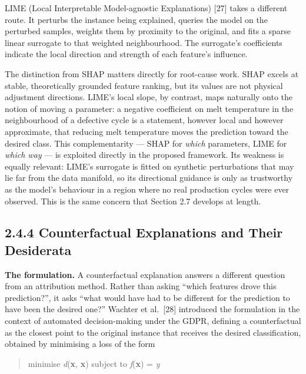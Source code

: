 LIME (Local Interpretable Model-agnostic Explanations) {[}27{]} takes a different route. It perturbs the instance being explained, queries the model on the perturbed samples, weights them by proximity to the original, and fits a sparse linear surrogate to that weighted neighbourhood. The surrogate's coefficients indicate the local direction and strength of each feature's influence.

The distinction from SHAP matters directly for root-cause work. SHAP excels at stable, theoretically grounded feature ranking, but its values are not physical adjustment directions. LIME's local slope, by contrast, maps naturally onto the notion of moving a parameter: a negative coefficient on melt temperature in the neighbourhood of a defective cycle is a statement, however local and however approximate, that reducing melt temperature moves the prediction toward the desired class. This complementarity --- SHAP for \emph{which} parameters, LIME for \emph{which way} --- is exploited directly in the proposed framework. Its weakness is equally relevant: LIME's surrogate is fitted on synthetic perturbations that may lie far from the data manifold, so its directional guidance is only as trustworthy as the model's behaviour in a region where no real production cycles were ever observed. This is the same concern that Section 2.7 develops at length.

\hypertarget{counterfactual-explanations-and-their-desiderata}{%
\subsection{2.4.4 Counterfactual Explanations and Their Desiderata}\label{counterfactual-explanations-and-their-desiderata}}

\textbf{The formulation.} A counterfactual explanation answers a different question from an attribution method. Rather than asking ``which features drove this prediction?'', it asks ``what would have had to be different for the prediction to have been the desired one?'' Wachter et al.~{[}28{]} introduced the formulation in the context of automated decision-making under the GDPR, defining a counterfactual as the closest point to the original instance that receives the desired classification, obtained by minimising a loss of the form

\begin{quote}
minimise \emph{d}(\textbf{x}, \textbf{x}\textquotesingle{}) subject to \emph{f}(\textbf{x}\textquotesingle{}) = \emph{y}\textquotesingle{}
\end{quote}

